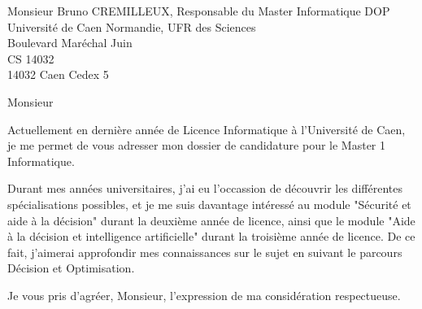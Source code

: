 \documentclass[12pt, a4paper]{lettre}
\makeatletter
\newcommand*{\noRule}{\renewcommand*{\rule@length}{0}}
\makeatother
\begin{document}
    
    \begin{letter}{Monsieur Bruno CREMILLEUX, Responsable du Master Informatique DOP\\Université de Caen Normandie, UFR des Sciences\\Boulevard Maréchal Juin\\CS 14032\\14032 Caen Cedex 5}
        \nolieu
        \nodate
        \noRule
        
        
        \opening{Monsieur}
            Actuellement en dernière année de Licence Informatique à l'Université de Caen, je me permet de vous adresser mon dossier de candidature pour le Master 1 Informatique.
            
            \vspace{1em}
            
            Durant mes années universitaires, j'ai eu l'occassion de découvrir les différentes spécialisations possibles, et je me suis davantage intéressé au module "Sécurité et aide à la décision" durant la deuxième année de licence, ainsi que le module "Aide à la décision et intelligence artificielle" durant la troisième année de licence. De ce fait, j'aimerai approfondir mes connaissances sur le sujet en suivant le parcours Décision et Optimisation.
        
        \closing{Je vous pris d'agréer, Monsieur, l'expression de ma considération respectueuse.}
    \end{letter}
    
\end{document}
